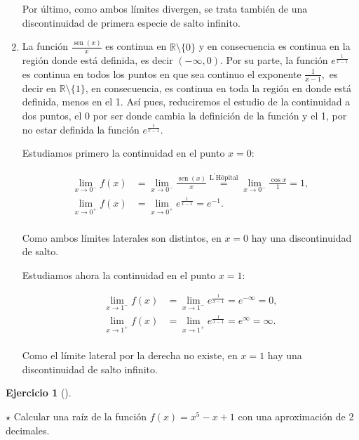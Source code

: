 \documentclass[
  a4paper,
]{scrreport}
\theoremstyle{definition}
\newtheorem{exercise}{Ejercicio}[chapter]
\theoremstyle{remark}
\begin{document}
\begin{tcolorbox}
\begin{enumerate}
  Por último, como ambos límites divergen, se trata también de una
  discontinuidad de primera especie de salto infinito.
\item
  La función \(\frac{\operatorname{sen}(x)}{x}\) es continua en
  \(\mathbb{R}\setminus{\{0\}}\) y en consecuencia es continua en la
  región donde está definida, es decir \((-\infty ,0)\). Por su parte,
  la función \(e^{\frac 1{x-1}}\) es continua en todos los puntos en que
  sea continuo el exponente \(\frac{1}{x-1},\) es decir en
  \(\mathbb{R}\setminus\{1\}\), en consecuencia, es continua en toda la
  región en donde está definida, menos en el 1. Así pues, reduciremos el
  estudio de la continuidad a dos puntos, el 0 por ser donde cambia la
  definición de la función y el 1, por no estar definida la función
  \(e^{\frac{1}{x-1}}.\)

  Estudiamos primero la continuidad en el punto \(x=0\):

  \begin{align*}
   \lim_{x\rightarrow 0^{-}}f(x) &= \lim_{x\rightarrow 0^{-}}\frac{\operatorname{sen}(x)}{x}\stackrel{\text{L}^{\prime }\text{H\^{o}pital}}{=} \lim_{x\rightarrow 0^{-}}\frac{\cos x}{1} = 1,\\
   \lim_{x\rightarrow 0^{+}}f(x) &= \lim_{x\rightarrow 0^{+}}e^{\frac{1}{x-1}} = e^{-1}.\\
   \end{align*}

  Como ambos límites laterales son distintos, en \(x=0\) hay una
  discontinuidad de salto.

  Estudiamos ahora la continuidad en el punto \(x=1\):

  \begin{align*}
   \lim_{x\rightarrow 1^{-}}f(x) &= \lim_{x\rightarrow 1^{-}}e^{\frac{1}{x-1}}=e^{-\infty }=0, \\
   \lim_{x\rightarrow 1^{+}}f(x) &= \lim_{x\rightarrow 1^{+}}e^{\frac{1}{x-1}}=e^\infty = \infty.\\ 
   \end{align*}

  Como el límite lateral por la derecha no existe, en \(x=1\) hay una
  discontinuidad de salto infinito.
\end{enumerate}

\end{tcolorbox}

\begin{exercise}[]\protect\hypertarget{exr-bolzano}{}\label{exr-bolzano}

\(\star\) Calcular una raíz de la función \(f(x)=x^5-x+1\) con una
aproximación de 2 decimales.

\end{exercise}
\end{document}
